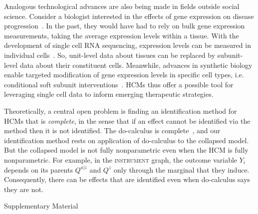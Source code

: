 \documentclass[12pt]{article}
\begin{document}
Analogous technological advances are also being made in fields outside social science.
Consider a biologist interested in the effects of gene expression on disease progression~\citep{Tejada-Lapuerta2023-wj}.
In the past, they would have had to rely on bulk gene expression measurements, taking the average expression levels within a tissue. 
With the development of single cell RNA sequencing, expression levels can be measured in individual cells~\citep{Klein2015-kg}.
So, unit-level data about tissues can be replaced by subunit-level data about their constituent cells.
Meanwhile, advances in synthetic biology enable targeted modification of gene expression levels in specific cell types, i.e. conditional soft subunit interventions~\citep{Hrvatin2019-zy}.
HCMs thus offer a possible tool for leveraging single cell data to inform emerging therapeutic strategies.






Theoretically, a central open problem is
finding an identification method for HCMs that is \textit{complete}, in the
sense that if an effect cannot be identified via the method then it is
not identified. The do-calculus is
complete~\citep{Shpitser2006-jg,Huang2006-ba}, and our identification
method rests on application of do-calculus to the collapsed model. But
the collapsed model is not fully nonparametric even when the HCM is
fully nonparametric. For example, in the \textsc{instrument} graph,
the outcome variable $Y_i$ depends on its parents $Q^{a|z}$ and $Q^z$
only through the marginal that they induce. Consequently, there can be
effects that are identified even when do-calculus says they are not.









 



\pagebreak
\appendix

{
\centering
\Large Supplementary Material
}
\renewcommand{\thefigure}{A\arabic{figure}}
\setcounter{figure}{0}
\renewcommand{\thesection}{\Alph{section}}
\setcounter{section}{0}
\renewcommand{\thetable}{A\arabic{table}}
\setcounter{table}{0}
\end{document}
